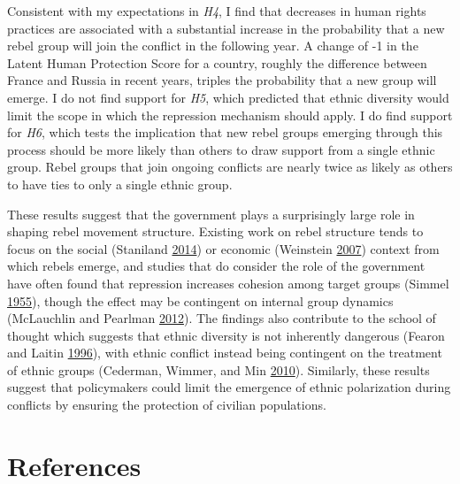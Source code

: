 \documentclass[12pt,]{book}
\theoremstyle{definition}
\theoremstyle{definition}
\theoremstyle{remark}
\begin{document}
Consistent with my expectations in \emph{H4}, I find that decreases in
human rights practices are associated with a substantial increase in the
probability that a new rebel group will join the conflict in the
following year. A change of -1 in the Latent Human Protection Score for
a country, roughly the difference between France and Russia in recent
years, triples the probability that a new group will emerge. I do not
find support for \emph{H5}, which predicted that ethnic diversity would
limit the scope in which the repression mechanism should apply. I do
find support for \emph{H6}, which tests the implication that new rebel
groups emerging through this process should be more likely than others
to draw support from a single ethnic group. Rebel groups that join
ongoing conflicts are nearly twice as likely as others to have ties to
only a single ethnic group.

These results suggest that the government plays a surprisingly large
role in shaping rebel movement structure. Existing work on rebel
structure tends to focus on the social (Staniland
\protect\hyperlink{ref-Staniland2014}{2014}) or economic (Weinstein
\protect\hyperlink{ref-Weinstein2007}{2007}) context from which rebels
emerge, and studies that do consider the role of the government have
often found that repression increases cohesion among target groups
(Simmel \protect\hyperlink{ref-Simmel1955}{1955}), though the effect may
be contingent on internal group dynamics (McLauchlin and Pearlman
\protect\hyperlink{ref-McLauchlin2012}{2012}). The findings also
contribute to the school of thought which suggests that ethnic diversity
is not inherently dangerous (Fearon and Laitin
\protect\hyperlink{ref-Fearon1996}{1996}), with ethnic conflict instead
being contingent on the treatment of ethnic groups (Cederman, Wimmer,
and Min \protect\hyperlink{ref-Cederman2010}{2010}). Similarly, these
results suggest that policymakers could limit the emergence of ethnic
polarization during conflicts by ensuring the protection of civilian
populations.

\chapter*{References}\label{references}


\indent

\setlength{\parindent}{-0.2in} \setlength{\leftskip}{0.2in}
\setlength{\parskip}{8pt}
\end{document}
